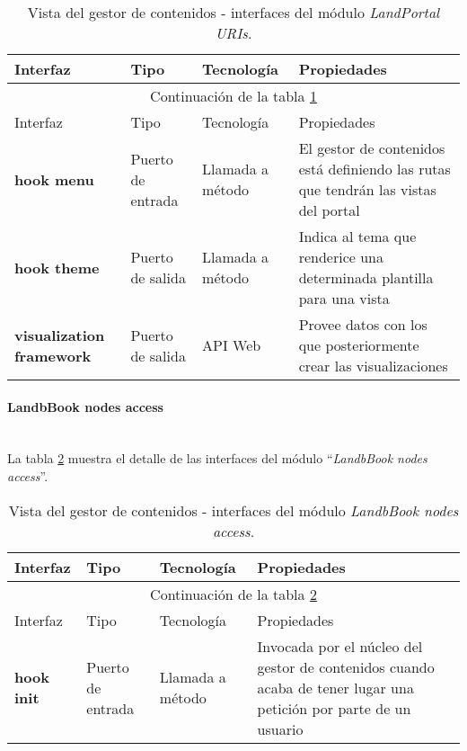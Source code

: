 \begin{longtable}[c]{|p{25mm}|p{20mm}|p{30mm}|p{60mm}|}
	\caption{Vista del gestor de contenidos - interfaces del módulo \textit{LandPortal URIs}. \label{interfaces_cms_landportal_uris}}\\
		\hline
			Interfaz & Tipo & Tecnología & Propiedades\\
		\hline
		\hline
	\endfirsthead
		\hline
		\multicolumn{4}{|c|}{Continuación de la tabla \ref{interfaces_cms_landportal_uris}}\\
		\hline
			Interfaz & Tipo & Tecnología & Propiedades\\
		\hline
		\hline
	\endhead
	\hline
	\endfoot
		\textbf{hook menu} & Puerto de entrada & Llamada a método & El gestor de contenidos está definiendo las rutas que tendrán las vistas del portal \\
		\hline
		\textbf{hook theme} & Puerto de salida & Llamada a método & Indica al tema que renderice una determinada plantilla para una vista \\
		\hline
		\textbf{visualization framework} & Puerto de salida & API Web & Provee datos con los que posteriormente crear las visualizaciones \\
	\hline
	\hline
\end{longtable}


\paragraph{LandbBook nodes access} \hfill \\
La tabla \ref{interfaces_cms_landbook_nodes_access} muestra el detalle de las interfaces del módulo ``\textit{LandbBook nodes access}''.  

\begin{longtable}[c]{|p{25mm}|p{20mm}|p{30mm}|p{60mm}|}
	\caption{Vista del gestor de contenidos - interfaces del módulo \textit{LandbBook nodes access}. \label{interfaces_cms_landbook_nodes_access}}\\
		\hline
			Interfaz & Tipo & Tecnología & Propiedades\\
		\hline
		\hline
	\endfirsthead
		\hline
		\multicolumn{4}{|c|}{Continuación de la tabla \ref{interfaces_cms_landbook_nodes_access}}\\
		\hline
			Interfaz & Tipo & Tecnología & Propiedades\\
		\hline
		\hline
	\endhead
	\hline
	\endfoot
		\textbf{hook init} & Puerto de entrada & Llamada a método & Invocada por el núcleo del gestor de contenidos cuando acaba de tener lugar una petición por parte de un usuario \\
	\hline
	\hline
\end{longtable}


